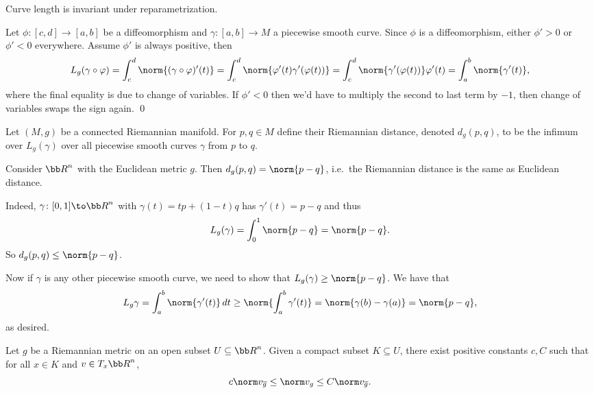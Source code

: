 \edefn

\bprop

    Curve length is invariant under reparametrization.

\eprop

\bproof

    Let $\phi\colon[c,d]\to[a,b]$ be a diffeomorphism and $\gamma\colon[a,b]\to M$ a piecewise smooth curve.
    Since $\phi$ is a diffeomorphism, either $\phi'>0$ or $\phi'<0$ everywhere.
    Assume $\phi'$ is always positive, then
    $$ L_g(\gamma\circ\phi) = \int_c^d\norm{(\gamma\circ\phi)'(t)} = \int_c^d\norm{\phi'(t)\gamma'(\phi(t))} = \int_c^d\norm{\gamma'(\phi(t))}\phi'(t) = \int_a^b\norm{\gamma'(t)} , $$
    where the final equality is due to change of variables.
    If $\phi'<0$ then we'd have to multiply the second to last term by $-1$, then change of variables swaps the sign again.
    \qed

\eproof

\bdefn

    Let $(M,g)$ be a connected Riemannian manifold.
    For $p,q\in M$ define their {\emphcolor Riemannian distance}, denoted $d_g(p,q)$, to be the infimum over $L_g(\gamma)$ over all piecewise smooth curves $\gamma$
    from $p$ to $q$.

\edefn

\bexam

    Consider $\bR^n$ with the Euclidean metric $g$.
    Then $d_g(p,q)=\norm{p-q}$, i.e.\ the Riemannian distance is the same as Euclidean distance.

    Indeed, $\gamma\colon[0,1]\to\bR^n$ with $\gamma(t)=tp+(1-t)q$ has $\gamma'(t)=p-q$ and thus
    $$ L_g(\gamma) = \int_0^1\norm{p-q} = \norm{p-q} . $$
    So $d_g(p,q)\leq\norm{p-q}$.

    Now if $\gamma$ is any other piecewise smooth curve, we need to show that $L_g(\gamma)\geq\norm{p-q}$.
    We have that
    $$ L_g\gamma = \int_a^b\norm{\gamma'(t)}\,dt \geq \norm{\int_a^b\gamma'(t)} = \norm{\gamma(b) - \gamma(a)} = \norm{p-q} , $$
    as desired.

\eexam

\blemm

    Let $g$ be a Riemannian metric on an open subset $U\subseteq\bR^n$.
    Given a compact subset $K\subseteq U$, there exist positive constants $c,C$ such that for all $x\in K$ and $v\in T_x\bR^n$,
    $$ c\norm v_{\bar g} \leq \norm v_g \leq C\norm v_{\bar g} . $$

\elemm

\bproof

